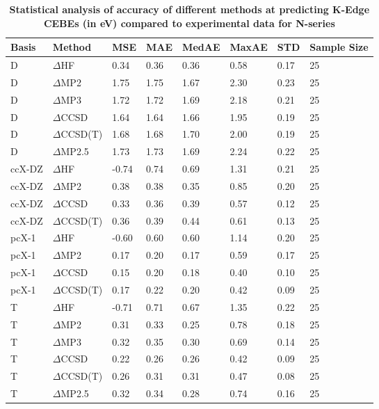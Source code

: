 \begin{table}
  \caption{\textbf{Statistical analysis of accuracy of different methods at predicting K-Edge CEBEs (in eV) compared to experimental data for N-series}}
  \label{tbl:method-summary-n}
  \begin{tabular}{l l l l l l l l }
    \toprule
    \textbf{Basis} & \textbf{Method} & \textbf{MSE} & \textbf{MAE} & \textbf{MedAE} & \textbf{MaxAE} & \textbf{STD} & \textbf{Sample Size} \\ 
    \midrule
    D & $\Delta$HF & 0.34 & 0.36 & 0.36 & 0.58 & 0.17 & 25 \\ 
    D & $\Delta$MP2 & 1.75 & 1.75 & 1.67 & 2.30 & 0.23 & 25 \\ 
    D & $\Delta$MP3 & 1.72 & 1.72 & 1.69 & 2.18 & 0.21 & 25 \\ 
    D & $\Delta$CCSD & 1.64 & 1.64 & 1.66 & 1.95 & 0.19 & 25 \\ 
    D & $\Delta$CCSD(T) & 1.68 & 1.68 & 1.70 & 2.00 & 0.19 & 25 \\ 
    D & $\Delta$MP2.5 & 1.73 & 1.73 & 1.69 & 2.24 & 0.22 & 25 \\ 
    ccX-DZ & $\Delta$HF & -0.74 & 0.74 & 0.69 & 1.31 & 0.21 & 25 \\ 
    ccX-DZ & $\Delta$MP2 & 0.38 & 0.38 & 0.35 & 0.85 & 0.20 & 25 \\ 
    ccX-DZ & $\Delta$CCSD & 0.33 & 0.36 & 0.39 & 0.57 & 0.12 & 25 \\ 
    ccX-DZ & $\Delta$CCSD(T) & 0.36 & 0.39 & 0.44 & 0.61 & 0.13 & 25 \\ 
    pcX-1 & $\Delta$HF & -0.60 & 0.60 & 0.60 & 1.14 & 0.20 & 25 \\ 
    pcX-1 & $\Delta$MP2 & 0.17 & 0.20 & 0.17 & 0.59 & 0.17 & 25 \\ 
    pcX-1 & $\Delta$CCSD & 0.15 & 0.20 & 0.18 & 0.40 & 0.10 & 25 \\ 
    pcX-1 & $\Delta$CCSD(T) & 0.17 & 0.22 & 0.20 & 0.42 & 0.09 & 25 \\ 
    T & $\Delta$HF & -0.71 & 0.71 & 0.67 & 1.35 & 0.22 & 25 \\ 
    T & $\Delta$MP2 & 0.31 & 0.33 & 0.25 & 0.78 & 0.18 & 25 \\ 
    T & $\Delta$MP3 & 0.32 & 0.35 & 0.30 & 0.69 & 0.14 & 25 \\ 
    T & $\Delta$CCSD & 0.22 & 0.26 & 0.26 & 0.42 & 0.09 & 25 \\ 
    T & $\Delta$CCSD(T) & 0.26 & 0.31 & 0.31 & 0.47 & 0.08 & 25 \\ 
    T & $\Delta$MP2.5 & 0.32 & 0.34 & 0.28 & 0.74 & 0.16 & 25 \\ 

\end{tabular}
\end{table}
